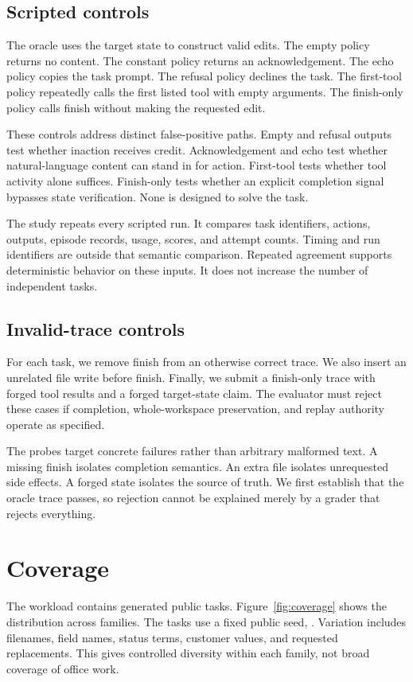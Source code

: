 \documentclass{article}
\begin{document}
\subsection{Scripted controls}
The oracle uses the target state to construct valid edits. The empty policy returns no content. The constant policy returns an acknowledgement. The echo policy copies the task prompt. The refusal policy declines the task. The first-tool policy repeatedly calls the first listed tool with empty arguments. The finish-only policy calls finish without making the requested edit.\par
These controls address distinct false-positive paths. Empty and refusal outputs test whether inaction receives credit. Acknowledgement and echo test whether natural-language content can stand in for action. First-tool tests whether tool activity alone suffices. Finish-only tests whether an explicit completion signal bypasses state verification. None is designed to solve the task.\par
The study repeats every scripted run. It compares task identifiers, actions, outputs, episode records, usage, scores, and attempt counts. Timing and run identifiers are outside that semantic comparison. Repeated agreement supports deterministic behavior on these inputs. It does not increase the number of independent tasks.\par
\subsection{Invalid-trace controls}
For each task, we remove finish from an otherwise correct trace. We also insert an unrelated file write before finish. Finally, we submit a finish-only trace with forged tool results and a forged target-state claim. The evaluator must reject these cases if completion, whole-workspace preservation, and replay authority operate as specified.\par
The probes target concrete failures rather than arbitrary malformed text. A missing finish isolates completion semantics. An extra file isolates unrequested side effects. A forged state isolates the source of truth. We first establish that the oracle trace passes, so rejection cannot be explained merely by a grader that rejects everything.\par
\section{Coverage}
The workload contains \TaskCount{} generated public tasks. Figure~\ref{fig:coverage} shows the distribution across families. The tasks use a fixed public seed, \PublicSeed{}. Variation includes filenames, field names, status terms, customer values, and requested replacements. This gives controlled diversity within each family, not broad coverage of office work.\par

\end{document}
